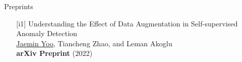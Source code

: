 \documentclass{resume} %
\begin{document}
%
%
%


\begin{rSection}{Preprints}
\smallskip
\begin{enumerate}[leftmargin=*]

	\item[{[i1]}]
		Understanding the Effect of Data Augmentation in Self-supervised Anomaly Detection \\
		\underline{Jaemin Yoo}, Tiancheng Zhao, and Leman Akoglu \\
		\textbf{arXiv Preprint} (2022) \\

\end{enumerate}
\end{rSection}
\end{document}

